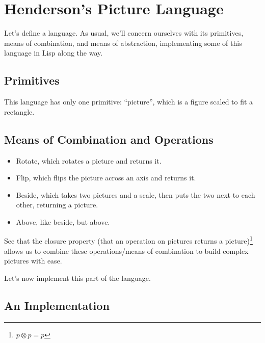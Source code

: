 \documentclass[9pt]{report}
\begin{document}
\section{Henderson's Picture Language}
\label{sec:org29fe7a3}

Let's define a language. As usual, we'll concern ourselves with its
primitives, means of combination, and means of abstraction,
implementing some of this language in Lisp along the way.


\subsection{Primitives}
\label{sec:org3b88e25}
This language has only one primitive: ``picture'', which is a figure
scaled to fit a rectangle.


\subsection{Means of Combination and Operations}
\label{sec:org0523c46}

\begin{itemize}
\item Rotate, which rotates a picture and returns it.
\item Flip, which flips the picture across an axis and returns it.
\item Beside, which takes two pictures and a scale, then puts the two
next to each other, returning a picture.
\item Above, like beside, but above.
\end{itemize}

See that the closure property (that an operation on pictures
returns a picture)\footnote{\(p \otimes p = p\)} allows us to combine these operations/means of
combination to build complex pictures with ease.

Let's now implement this part of the language.

\subsection{An Implementation}
\label{sec:org3a0ea02}
\end{document}
